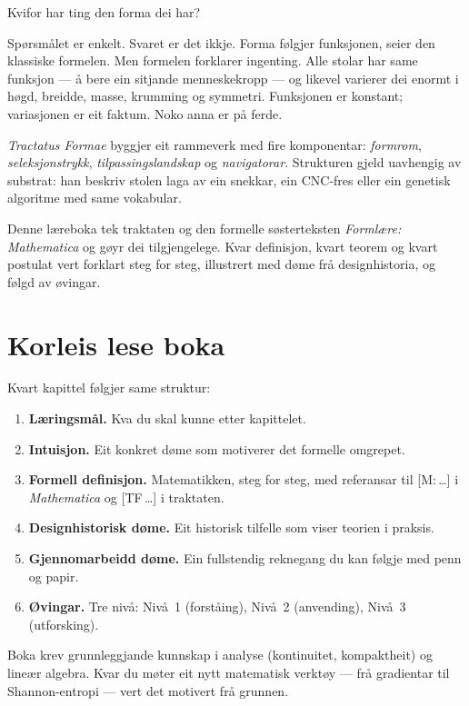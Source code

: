 \documentclass[10pt]{book}
\theoremstyle{definition}
\theoremstyle{plain}
\theoremstyle{remark}
\newcommand{\TF}[1]{\textnormal{[TF\,#1]}}
\newcommand{\Mref}[1]{\textnormal{[M:\,#1]}}
\begin{document}
Kvifor har ting den forma dei har?

Sp\o rsm\aa let er enkelt. Svaret er det ikkje. Forma f\o lgjer funksjonen, seier den klassiske formelen. Men formelen forklarer ingenting. Alle stolar har same funksjon --- \aa{} bere ein sitjande menneskekropp --- og likevel varierer dei enormt i h\o gd, breidde, masse, krumming og symmetri. Funksjonen er konstant; variasjonen er eit faktum. Noko anna er p\aa{} ferde.

\textit{Tractatus Formae} byggjer eit rammeverk med fire komponentar: \textit{formrom}, \textit{seleksjonstrykk}, \textit{tilpassingslandskap} og \textit{navigatorar}. Strukturen gjeld uavhengig av substrat: han beskriv stolen laga av ein snekkar, ein CNC-fres eller ein genetisk algoritme med same vokabular.

Denne l\ae reboka tek traktaten og den formelle s\o sterteksten \textit{Forml\ae re: Mathematica} og g\o yr dei til\-gjengelege. Kvar definisjon, kvart teorem og kvart postulat vert forklart steg for steg, illustrert med d\o me fr\aa{} designhistoria, og f\o lgd av \o vingar.

\section*{Korleis lese boka}

Kvart kapittel f\o lgjer same struktur:

\begin{enumerate}
  \item \textbf{L\ae ringsm\aa l.} Kva du skal kunne etter kapittelet.
  \item \textbf{Intuisjon.} Eit konkret d\o me som motiverer det formelle omgrepet.
  \item \textbf{Formell definisjon.} Matematikken, steg for steg, med referansar til \Mref{\ldots} i \textit{Mathematica} og \TF{\ldots} i traktaten.
  \item \textbf{Designhistorisk d\o me.} Eit historisk tilfelle som viser teorien i praksis.
  \item \textbf{Gjennomarbeidd d\o me.} Ein fullstendig reknegang du kan f\o lgje med penn og papir.
  \item \textbf{\O vingar.} Tre niv\aa: Niv\aa~1 (forst\aa ing), Niv\aa~2 (anvending), Niv\aa~3 (utforsking).
\end{enumerate}

Boka krev grunnleggjande kunnskap i analyse (kontinuitet, kompaktheit) og line\ae r algebra. Kvar du m\o ter eit nytt matematisk verkt\o y --- fr\aa{} gradientar til Shannon-entropi --- vert det motivert fr\aa{} grunnen.
\end{document}
